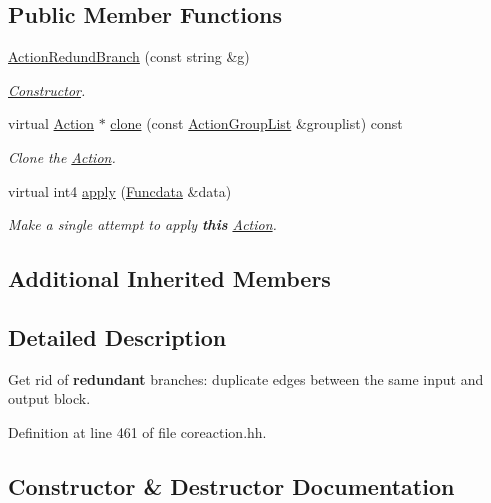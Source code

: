\subsection*{Public Member Functions}
\begin{DoxyCompactItemize}
\item 
\mbox{\hyperlink{class_action_redund_branch_a024c34d46e588fd2aeb8cc12599f6c77}{Action\+Redund\+Branch}} (const string \&g)
\begin{DoxyCompactList}\small\item\em \mbox{\hyperlink{class_constructor}{Constructor}}. \end{DoxyCompactList}\item 
virtual \mbox{\hyperlink{class_action}{Action}} $\ast$ \mbox{\hyperlink{class_action_redund_branch_a116163afe83810fd44a1137ee040718a}{clone}} (const \mbox{\hyperlink{class_action_group_list}{Action\+Group\+List}} \&grouplist) const
\begin{DoxyCompactList}\small\item\em Clone the \mbox{\hyperlink{class_action}{Action}}. \end{DoxyCompactList}\item 
virtual int4 \mbox{\hyperlink{class_action_redund_branch_ac7caec1379a7cb37fba45fe2bd75199f}{apply}} (\mbox{\hyperlink{class_funcdata}{Funcdata}} \&data)
\begin{DoxyCompactList}\small\item\em Make a single attempt to apply {\bfseries{this}} \mbox{\hyperlink{class_action}{Action}}. \end{DoxyCompactList}\end{DoxyCompactItemize}
\subsection*{Additional Inherited Members}


\subsection{Detailed Description}
Get rid of {\bfseries{redundant}} branches\+: duplicate edges between the same input and output block. 

Definition at line 461 of file coreaction.\+hh.



\subsection{Constructor \& Destructor Documentation}
\mbox{\label{class_action_redund_branch_a024c34d46e588fd2aeb8cc12599f6c77}} 
